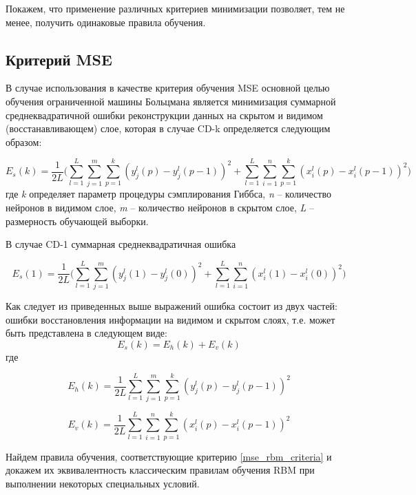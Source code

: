 Покажем, что применение различных критериев минимизации позволяет, тем не менее, получить одинаковые правила обучения.

\subsection{Критерий MSE}

В случае использования в качестве критерия обучения MSE основной целью обучения ограниченной машины Больцмана является минимизация суммарной среднеквадратичной ошибки реконструкции данных на скрытом и видимом (восстанавливающем) слое, которая в случае CD-k определяется следующим образом:	

\begin{equation*}	
    E_s(k)=\frac{1}{2L}\Bigg(\sum_{l=1}^L\sum_{j=1}^m\sum_{p=1}^k (y_j^l(p)-y_j^l(p-1))^2+\sum_{l=1}^L\sum_{i=1}^n\sum_{p=1}^k (x_i^l(p)-x_i^l(p-1))^2\Bigg)
\end{equation*}
где \textit{k} определяет параметр процедуры сэмплирования Гиббса, \textit{n} -- количество нейронов в видимом слое, \textit{m} -- количество нейронов в скрытом слое, \textit{L} -- размерность обучающей выборки.

В случае CD-1  суммарная среднеквадратичная ошибка	

\begin{equation}
    E_s(1)=\frac{1}{2L}\Bigg(\sum_{l=1}^L\sum_{j=1}^m (y_j^l(1)-y_j^l(0))^2+\sum_{l=1}^L\sum_{i=1}^n (x_i^l(1)-x_i^l(0))^2\Bigg)
\end{equation}

Как следует из приведенных выше выражений ошибка состоит из двух частей: ошибки восстановления информации на видимом и скрытом слоях, т.е. может быть представлена в следующем виде:
\begin{equation}
	\label{mse_rbm_criteria}
	E_s(k) = E_h(k) + E_v(k)
\end{equation}
где

\begin{equation}
	E_h(k) = \frac{1}{2L}\sum_{l=1}^L\sum_{j=1}^m\sum_{p=1}^k (y_j^l(p)-y_j^l(p-1))^2
\end{equation}

\begin{equation}
	E_v(k) = \frac{1}{2L}\sum_{l=1}^L\sum_{i=1}^n\sum_{p=1}^k (x_i^l(p)-x_i^l(p-1))^2
\end{equation}

Найдем правила обучения, соответствующие критерию \ref{mse_rbm_criteria} и докажем их эквивалентность классическим правилам обучения RBM при выполнении некоторых специальных условий.

